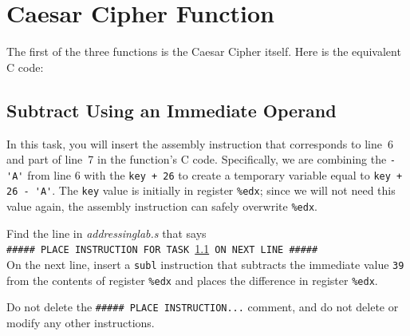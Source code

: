 \section{Caesar Cipher Function}

The first of the three functions is the Caesar Cipher itself. Here is the
equivalent C code:



\subsection{Subtract Using an Immediate Operand}\label{task1}

In this task, you will insert the assembly instruction that corresponds to
line~6 and part of line~7 in the function's C code. Specifically, we are
combining the \lstinline{-'A'} from line 6 with the \lstinline{key + 26} to
create a temporary variable equal to \lstinline{key + 26 - 'A'}. The
\lstinline{key} value is initially in register \lstinline{%edx}; since we will
not need this value again, the assembly instruction can safely overwrite
\lstinline{%edx}.

Find the line in \textit{addressinglab.s} that says \\
\texttt{\#\#\#\#\# PLACE INSTRUCTION FOR TASK \ref{task1} ON NEXT LINE \#\#\#\#\#} \\
On the next line, insert a \lstinline{subl} instruction that subtracts the
immediate value \lstinline{39} from the contents of register \lstinline{%edx}
and places the difference in register \lstinline{%edx}.


Do not delete the \texttt{\#\#\#\#\# PLACE INSTRUCTION...} comment, and do not
delete or modify any other instructions.

%
%
%
%

